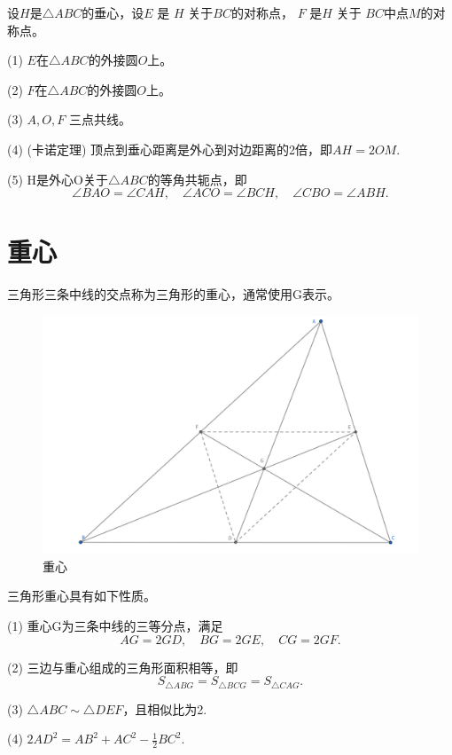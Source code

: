 \begin{theorem}[垂心的对称性质]
    设$H$是$\triangle ABC$的垂心，设$E$ 是 $H$ 关于$BC$的对称点， $F$ 是$H$ 关于 $BC$中点$M$的对称点。

    (1) $E$在$\triangle ABC$的外接圆$O$上。


    (2) $F$在$\triangle ABC$的外接圆$O$上。

    (3) $A, O, F$ 三点共线。

    (4) (卡诺定理) 顶点到垂心距离是外心到对边距离的2倍，即$AH = 2OM.$
   
    (5) H是外心O关于$\triangle ABC$的等角共轭点，即
    $$\angle BAO = \angle CAH, \quad 
    \angle ACO = \angle BCH, \quad 
    \angle CBO = \angle ABH.$$
\end{theorem}



\newpage
\section{重心}
\begin{definition}[重心]
    三角形三条中线的交点称为三角形的重心，通常使用G表示。
\end{definition}

\begin{figure}[H]
    \centering
    \includegraphics[width=0.8\linewidth]{figures/重心.png}
    \caption{重心}
\end{figure}

\begin{proposition}[重心性质]
    三角形重心具有如下性质。
    
    (1) 重心G为三条中线的三等分点，满足
    $$AG=2GD,\quad 
    BG=2GE,\quad
    CG=2GF.$$

    (2) 三边与重心组成的三角形面积相等，即
    $$S_{\triangle ABG} = S_{\triangle BCG}=S_{\triangle CAG}.$$

    (3) $\triangle ABC \sim \triangle DEF$，且相似比为2.

    (4) $2AD^2=AB^2+AC^2-\frac{1}{2}BC^2.$
\end{proposition}
\newpage
